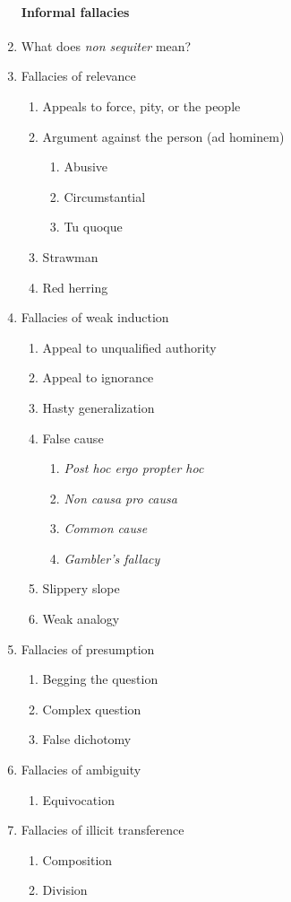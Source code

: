 \documentclass[10pt,landscape]{article}
\begin{document}
\begin{multicols}{2}
\begin{enumerate}
\paragraph{Informal fallacies}
    \item What does \textit{non sequiter} mean?
    \item Fallacies of relevance
      \begin{enumerate}
       \item Appeals to force, pity, or the people
       \item Argument against the person (ad hominem)
	\begin{enumerate}
	 \item Abusive
	 \item Circumstantial
	 \item Tu quoque
	\end{enumerate}
       \item Strawman
       \item Red herring
      \end{enumerate}
    \item Fallacies of weak induction
      \begin{enumerate}
       \item Appeal to unqualified authority
       \item Appeal to ignorance
       \item Hasty generalization
       \item False cause
	\begin{enumerate}
	 \item \textit{Post hoc ergo propter hoc}
	 \item \textit{Non causa pro causa}
	 \item \textit{Common cause}
	 \item \textit{Gambler's fallacy}
	\end{enumerate}
       \item Slippery slope
       \item Weak analogy
      \end{enumerate}
   \item Fallacies of presumption
      \begin{enumerate}
        \item Begging the question
        \item Complex question
        \item False dichotomy
      \end{enumerate}
    \item Fallacies of ambiguity
      \begin{enumerate}
        \item Equivocation
      \end{enumerate}
    \item Fallacies of illicit transference
      \begin{enumerate}
	\item Composition
	\item Division
      \end{enumerate}
  

\end{enumerate}
\end{multicols}
\end{document}
